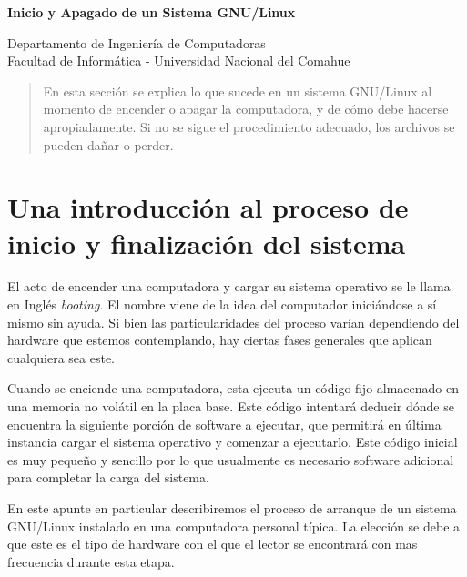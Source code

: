 \documentclass[12pt]{article}
\def\maketitle{

 \makeatletter
 {\color{bl} \centering \huge \sc \textbf{
Inicio y Apagado de un Sistema GNU/Linux \\ 
 \vspace*{8pt} }\par}
 \makeatother


 \makeatletter
 {\centering \small 
 	Departamento de Ingeniería de Computadoras \\
 	Facultad de Informática - Universidad Nacional del Comahue \\
 	\vspace{20pt} }
 \makeatother

}
\begin{document}
\thispagestyle{empty}
\maketitle
\setlength{\parindent}{0pt}


\begin{abstract}
 En esta sección se explica lo que sucede en un sistema GNU/Linux al momento
de encender o apagar la computadora, y de cómo debe hacerse apropiadamente. Si
no se sigue el procedimiento adecuado, los archivos se pueden dañar o perder.
\end{abstract}



\section{Una introducción al proceso de inicio y finalización del sistema}

El acto de  encender una computadora y cargar su sistema operativo 
se le llama en Inglés \textit{booting}. El nombre viene de
la idea del computador iniciándose a sí mismo sin ayuda. Si bien las particularidades
del proceso varían dependiendo del hardware que estemos contemplando, hay ciertas
fases generales que aplican cualquiera sea este. 

Cuando se enciende una computadora, esta ejecuta un código fijo almacenado en una 
memoria no volátil en la placa base. Este código intentará deducir dónde se encuentra
la siguiente porción de software a ejecutar, que permitirá en última instancia 
cargar el sistema operativo y comenzar a ejecutarlo. Este código inicial es muy pequeño 
y sencillo por lo 
que usualmente es necesario software adicional para completar la carga del sistema. 

En este apunte en particular describiremos el proceso de arranque de un sistema 
GNU/Linux instalado en una computadora personal típica. La elección se debe a que 
este es el tipo de hardware con el que el lector se encontrará con mas frecuencia 
durante esta etapa.  
\end{document}
